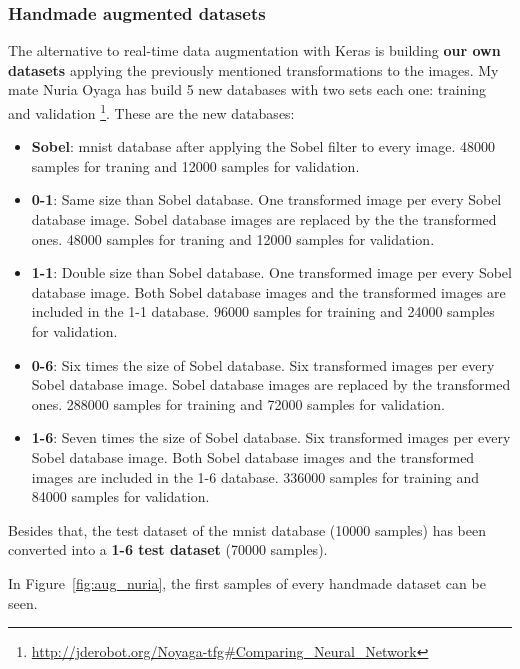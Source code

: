 \subsubsection{Handmade augmented datasets}\label{subsec:handmade}
The alternative to real-time data augmentation with Keras is building \textbf{our own datasets} applying the previously mentioned transformations to the images. My mate Nuria Oyaga has build 5 new databases with two sets each one: training and validation \footnote{\url{http://jderobot.org/Noyaga-tfg\#Comparing_Neural_Network}}. These are the new databases: 
\begin{itemize}
	\item \textbf{Sobel}: \gls{mnist} database after applying the Sobel filter to every image. 48000 samples for traning and 12000 samples for validation. 
	\item \textbf{0-1}: Same size than Sobel database. One transformed image per every Sobel database image. Sobel database images are replaced by the the transformed ones. 48000 samples for traning and 12000 samples for validation. 
	\item \textbf{1-1}: Double size than Sobel database. One transformed image per every Sobel database image. Both Sobel database images and the transformed images are included in the 1-1 database. 96000 samples for training and 24000 samples for validation. 
	\item \textbf{0-6}: Six times the size of Sobel database. Six transformed images per every Sobel database image. Sobel database images are replaced by the transformed ones. 288000 samples for training and 72000 samples for validation. 
	\item \textbf{1-6}: Seven times the size of Sobel database. Six transformed images per every Sobel database image. Both Sobel database images and the transformed images are included in the 1-6 database. 336000 samples for training and 84000 samples for validation. 
\end{itemize}

Besides that, the test dataset of the \gls{mnist} database (10000 samples) has been converted into a \textbf{1-6 test dataset} (70000 samples).

In Figure~\ref{fig:aug_nuria}, the first samples of every handmade dataset can be seen.

